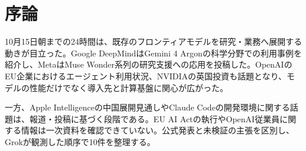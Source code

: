 \section*{序論}
10月15日朝までの24時間は、既存のフロンティアモデルを研究・業務へ展開する動きが目立った。Google DeepMindはGemini 4 Argonの科学分野での利用事例を紹介し、MetaはMuse Wonder系列の研究支援への応用を投稿した。OpenAIのEU企業におけるエージェント利用状況、NVIDIAの英国投資も話題となり、モデルの性能だけでなく導入先と計算基盤に関心が広がった。

一方、Apple Intelligenceの中国展開見通しやClaude Codeの開発環境に関する話題は、報道・投稿に基づく段階である。EU AI Actの執行やOpenAI従業員に関する情報は一次資料を確認できていない。公式発表と未検証の主張を区別し、Grokが観測した順序で10件を整理する。
